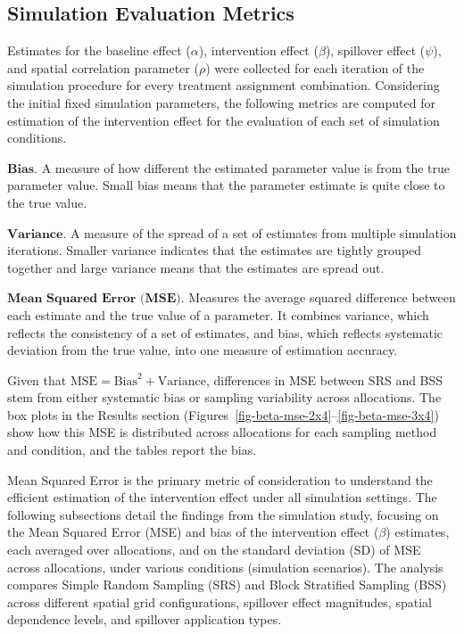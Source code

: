 \documentclass[
  12pt,
  prelim]{bios-prelim}
\begin{document}
\subsection{Simulation Evaluation
Metrics}\label{simulation-evaluation-metrics}

Estimates for the baseline effect (\(\alpha\)), intervention effect
(\(\beta\)), spillover effect (\(\psi\)), and spatial correlation
parameter (\(\rho\)) were collected for each iteration of the simulation
procedure for every treatment assignment combination. Considering the
initial fixed simulation parameters, the following metrics are computed
for estimation of the intervention effect for the evaluation of each set
of simulation conditions.

\noindent \(\textbf{Bias.}\) A measure of how different the estimated
parameter value is from the true parameter value. Small bias means that
the parameter estimate is quite close to the true value.

\noindent \(\textbf{Variance.}\) A measure of the spread of a set of
estimates from multiple simulation iterations. Smaller variance
indicates that the estimates are tightly grouped together and large
variance means that the estimates are spread out.

\noindent \(\textbf{Mean Squared Error (MSE).}\) Measures the average
squared difference between each estimate and the true value of a
parameter. It combines variance, which reflects the consistency of a set
of estimates, and bias, which reflects systematic deviation from the
true value, into one measure of estimation accuracy.

Given that \(\text{MSE} = \text{Bias}^2 + \text{Variance}\), differences
in MSE between SRS and BSS stem from either systematic bias or sampling
variability across allocations. The box plots in the Results section
(Figures~\ref{fig-beta-mse-2x4}--\ref{fig-beta-mse-3x4}) show how this
MSE is distributed across allocations for each sampling method and
condition, and the tables report the bias.

Mean Squared Error is the primary metric of consideration to understand
the efficient estimation of the intervention effect under all simulation
settings. The following subsections detail the findings from the
simulation study, focusing on the Mean Squared Error (MSE) and bias of
the intervention effect (\(\beta\)) estimates, each averaged over
allocations, and on the standard deviation (SD) of MSE across
allocations, under various conditions (simulation scenarios). The
analysis compares Simple Random Sampling (SRS) and Block Stratified
Sampling (BSS) across different spatial grid configurations, spillover
effect magnitudes, spatial dependence levels, and spillover application
types.
\end{document}
